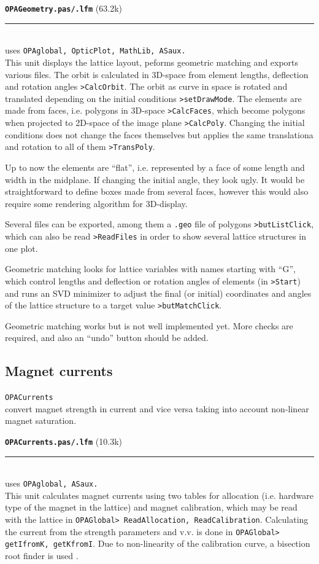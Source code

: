 \documentclass[12pt]{article}
\newcommand\code[1]{{\tt #1}}
\newcommand{\unico}[1]{{\color{burntorange}\code{#1}}}
\newcommand{\opagui}[1]{\colorbox{blue!20}{\code{#1}}}
\newcommand{\oguih}[2]{\subsection{\label{#2}#1}{\Huge\opagui{#2}}\\}
\newcommand{\todo}[1]{{\color{red} #1}}
\newcommand\opamodule[3]{{\bf \tt #1} #2\\  \rule[3pt]{\textwidth}{0.2pt} \\ {\scriptsize uses \tt  #3}\\[1ex]}
\begin{document}
\opamodule{OPAGeometry.pas/.lfm}{(63.2k)}{OPAglobal, OpticPlot, MathLib, ASaux.}
This unit displays the lattice layout, peforms geometric matching and exports various files.
The orbit is calculated in 3D-space from element lengths, deflection and rotation angles \code{>CalcOrbit}. The orbit as curve in space is rotated and translated depending on the initial conditions \code{>setDrawMode}.
The elements are made from faces, i.e. polygons in 3D-space \code{>CalcFaces}, which become polygons when projected to 2D-space of the image plane \code{>CalcPoly}. Changing the initial conditions does not change the faces themselves but applies the same translationa and rotation to all of them \code{>TransPoly}.

\todo{Up to now the elements are ``flat'', i.e. represented by a face of some length and width in the midplane. If changing the initial angle, they look ugly. It would be straightforward to define boxes made from several faces, however this would also require some rendering algorithm for 3D-display.}

Several files can be exported, among them a \code{.geo} file of polygons \code{>butListClick}, which can also be read \code{>ReadFiles} in order to show several lattice structures in one plot.

Geometric matching looks for lattice variables with names starting with ``G'', which control lengths and deflection or rotation angles of elements (in \code{>Start}) and runs an SVD minimizer to adjust the final (or initial) coordinates and angles of the lattice structure to a target value \code{>butMatchClick}.

\todo{Geometric matching works but is not well implemented yet. More checks are required, and also an ``undo'' button should be added.}




\oguih{Magnet currents}{OPACurrents}

\unico{getKfromI, getdKdIfac, getIfromK} convert  magnet strength in current and vice versa taking into account non-linear magnet saturation.

\opamodule{OPACurrents.pas/.lfm}{(10.3k)}{OPAglobal, ASaux.}
This unit calculates magnet currents using two tables for allocation (i.e. hardware type of the magnet in the lattice) and magnet calibration, which may be read with the lattice in \code{OPAGlobal> ReadAllocation, ReadCalibration}. Calculating the current from the strength parameters and v.v. is done in \code{OPAGlobal> getIfromK, getKfromI}. Due to non-linearity of the calibration curve, a bisection root finder is used \cite{numrec}.
\end{document}
